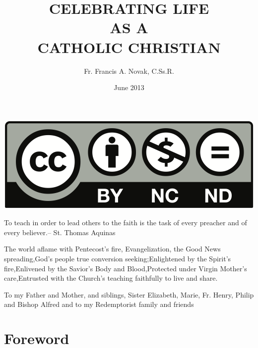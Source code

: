 \documentclass[oneside]{book}
\begin{document}
\begin{center}
\includegraphics[scale=0.6]{by-nc-nd}
\end{center}


To teach in order to lead others to the faith is the task of every preacher and
of every believer.– St. Thomas Aquinas


The world aflame with Pentecost’s fire, Evangelization, the Good News
spreading,God’s people true conversion seeking;Enlightened by the Spirit’s
fire,Enlivened by the Savior’s Body and Blood,Protected under Virgin Mother’s
care,Entrusted with the Church’s teaching faithfully to live and share.


To my Father and Mother, and siblings, Sister Elizabeth, Marie, Fr. Henry,
Philip and Bishop Alfred and to my Redemptorist family and friends


\title{\textbf{CELEBRATING LIFE} \\ AS A \\ \textbf{CATHOLIC CHRISTIAN}}
\author{Fr. Francis A. Novak, C.Ss.R.}
\date{June 2013}

\maketitle


\chapter{Foreword}
\end{document}
